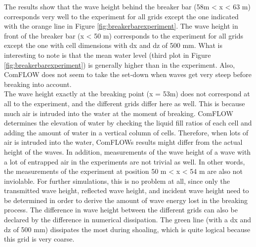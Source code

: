 The results show that the wave height behind the breaker bar (58m < x < 63 m) corresponds very well to the experiment for all grids except the one indicated with the orange line in Figure \ref{fig:breakerbarexperiment}. The wave height in front of the breaker bar (x < 50 m) corresponds to the experiment for all grids except the one with cell dimensions with dx and dz of 500 mm. What is interesting to note is that the mean water level (third plot in Figure \ref{fig:breakerbarexperiment}) is generally higher than in the experiment.  Also, ComFLOW does not seem to take the set-down when waves get very steep before breaking into account. \\
The wave height exactly at the breaking point (x = 53m) does not correspond at all to the experiment, and the different grids differ here as well. This is because much air is intruded into the water at the moment of breaking. ComFLOW determines the elevation of water by checking the liquid fill ratios of each cell and adding the amount of water in a vertical column of cells. Therefore, when lots of air is intruded into the water, ComFLOWs results might differ from the actual height of the waves. In addition, measurements of the wave height of a wave with a lot of entrapped air in the experiments are not trivial as well. In other words, the measurements of the experiment at position 50 m < x < 54 m are also not inviolable. For further simulations, this is no problem at all, since only the transmitted wave height, reflected wave height, and incident wave height need to be determined in order to derive the amount of wave energy lost in the breaking process. The difference in wave height between the different grids can also be declared by the difference in numerical dissipation. The green line (with a dx and dz of 500 mm) dissipates the most during shoaling, which is quite logical because this grid is very coarse. \\


